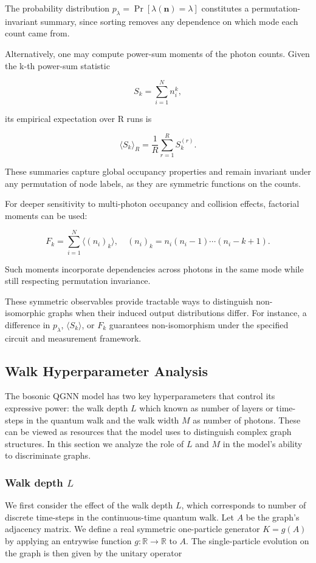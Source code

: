 \documentclass[11pt]{article}
\begin{document}
The probability distribution $p_\lambda = \Pr[\lambda(\mathbf{n}) = \lambda]$ constitutes a permutation-invariant summary, since sorting removes any dependence on which mode each count came from.

Alternatively, one may compute {power-sum moments} of the photon counts. Given the k-th power-sum statistic

$$
S_k = \sum_{i=1}^N n_i^k,
$$

its empirical expectation over R runs is

$$
\langle S_k \rangle_R = \frac{1}{R} \sum_{r=1}^R S_k^{(r)}.
$$

These summaries capture global occupancy properties and remain invariant under any permutation of node labels, as they are symmetric functions on the counts.

For deeper sensitivity to multi-photon occupancy and collision effects, factorial moments can be used:

$$
F_k = \sum_{i=1}^N \langle (n_i)_k \rangle,
\quad (n_i)_k = n_i(n_i - 1) \cdots (n_i - k + 1).
$$

Such moments incorporate dependencies across photons in the same mode while still respecting permutation invariance.

These symmetric observables provide tractable ways to distinguish non-isomorphic graphs when their induced output distributions differ. For instance, a difference in $p_\lambda$, $\langle S_k \rangle$, or $F_k$ guarantees non-isomorphism under the specified circuit and measurement framework.

\subsection{Walk Hyperparameter Analysis}

The bosonic QGNN model has two key hyperparameters that control its expressive power: the walk depth $L$ which known as number of layers or time-steps in the quantum walk and the walk width $M$ as number of photons. These can be viewed as resources that the model uses to distinguish complex graph structures. In this section we analyze the role of $L$ and $M$ in the model’s ability to discriminate graphs.

\subsubsection{Walk depth $L$}

We first consider the effect of the walk depth $L$, which corresponds to number of discrete time-steps in the continuous-time quantum walk. Let $A$ be the graph's adjacency matrix. We define a real symmetric one-particle generator $K = g(A)$ by applying an entrywise function $g: \mathbb{R} \to \mathbb{R}$ to $A$. The single-particle evolution on the graph is then given by the unitary operator
\end{document}
